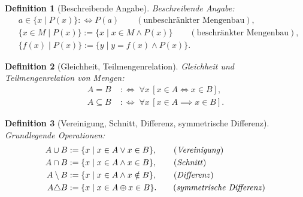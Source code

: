 \documentclass[a4paper,11pt,fleqn,twoside]{scrartcl}
\numberwithin{equation}{section}
\theoremstyle{rmbox}
\newtheorem{Definition}{Definition}
\newcommand{\emdef}[1]{\emph{#1}}
\begin{document}
\begin{Definition}[Beschreibende Angabe]
\emph{Beschreibende Angabe}:
\begin{align}
& a\in\{x\mid P(x)\} :\Longleftrightarrow P(a)\qquad(\text{unbeschränkter Mengenbau}),\\
& \{x\in M\mid P(x)\} := \{x\mid x\in M\land P(x)\}\qquad(\text{beschränkter Mengenbau}),\\
& \{f(x)\mid P(x)\} := \{y\mid y=f(x)\land P(x)\}.
\end{align}
\end{Definition}
\begin{Definition}[Gleichheit, Teilmengenrelation]
\emph{Gleichheit} und \emdef{Teilmengenrelation}
von Mengen:
\begin{align}
A=B &\;:\Longleftrightarrow\;\forall x\,[x\in A\iff x\in B],\\
A\subseteq B &\;:\Longleftrightarrow\;\forall x\,[x\in A\implies x\in B].
\end{align}
\end{Definition}
\noindent
\begin{Definition}[Vereinigung, Schnitt, Differenz, symmetrische Differenz]
Grundlegende Operationen:
\begin{align}
A\cup B &:= \{x\mid x\in A\lor x\in B\},\qquad (\text{\emdef{Vereinigung}})\\
A\cap B &:= \{x\mid x\in A\land x\in B\},\qquad (\text{\emdef{Schnitt}})\\
A\setminus B &:= \{x\mid x\in A\land x\notin B\},\qquad (\text{\emdef{Differenz}})\\
A\triangle B &:= \{x\mid x\in A\oplus x\in B\}.\qquad (\text{\emdef{symmetrische Differenz}})
\end{align}
\end{Definition}
\end{document}
